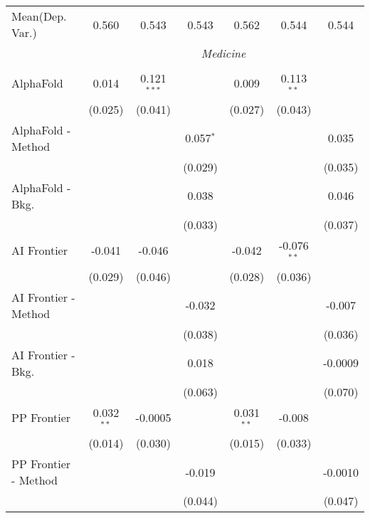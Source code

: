 \begin{tabular}{lcccccc}
Mean(Dep. Var.) & 0.560 & 0.543 & 0.543 & 0.562 & 0.544 & 0.544 \\
 & \multicolumn{6}{c}{\textit{Medicine}} \\ \\
   AlphaFold            & 0.014        & 0.121$^{***}$ &             & 0.009        & 0.113$^{**}$  &   \\   
                        & (0.025)      & (0.041)       &             & (0.027)      & (0.043)       &   \\   
   AlphaFold - Method   &              &               & 0.057$^{*}$ &              &               & 0.035\\   
                        &              &               & (0.029)     &              &               & (0.035)\\   
   AlphaFold - Bkg.     &              &               & 0.038       &              &               & 0.046\\   
                        &              &               & (0.033)     &              &               & (0.037)\\   
   AI Frontier          & -0.041       & -0.046        &             & -0.042       & -0.076$^{**}$ &   \\   
                        & (0.029)      & (0.046)       &             & (0.028)      & (0.036)       &   \\   
   AI Frontier - Method &              &               & -0.032      &              &               & -0.007\\   
                        &              &               & (0.038)     &              &               & (0.036)\\   
   AI Frontier - Bkg.   &              &               & 0.018       &              &               & -0.0009\\   
                        &              &               & (0.063)     &              &               & (0.070)\\   
   PP Frontier          & 0.032$^{**}$ & -0.0005       &             & 0.031$^{**}$ & -0.008        &   \\   
                        & (0.014)      & (0.030)       &             & (0.015)      & (0.033)       &   \\   
   PP Frontier - Method &              &               & -0.019      &              &               & -0.0010\\   
                        &              &               & (0.044)     &              &               & (0.047)\\   

\end{tabular}
